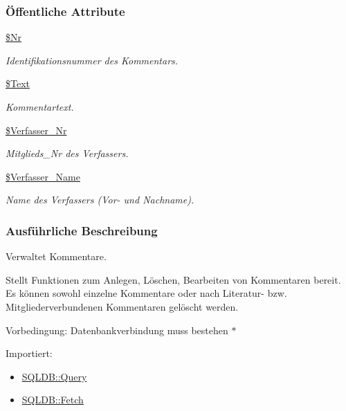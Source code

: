 \subsubsection*{\"{O}ffentliche Attribute}
\begin{CompactItemize}
\item 
\hyperlink{classKommentar_1b0a3cfcb9fc7075f985cc8067ab1982}{\$Nr}
\begin{CompactList}\small\item\em Identifikationsnummer des Kommentars. \item\end{CompactList}\item 
\hyperlink{classKommentar_c9a481413d6ba0c000719ad514bad4b5}{\$Text}
\begin{CompactList}\small\item\em Kommentartext. \item\end{CompactList}\item 
\hyperlink{classKommentar_c92b002e40690ee052fec446ff2a0ef6}{\$Verfasser\_\-Nr}
\begin{CompactList}\small\item\em Mitglieds\_\-Nr des Verfassers. \item\end{CompactList}\item 
\hyperlink{classKommentar_84f0fc10295968adde28169f8df018d9}{\$Verfasser\_\-Name}
\begin{CompactList}\small\item\em Name des Verfassers (Vor- und Nachname). \item\end{CompactList}\end{CompactItemize}


\subsubsection{Ausf\"{u}hrliche Beschreibung}
Verwaltet Kommentare. 

Stellt Funktionen zum Anlegen, Löschen, Bearbeiten von Kommentaren bereit. Es können sowohl einzelne Kommentare oder nach Literatur- bzw. Mitgliederverbundenen Kommentaren gelöscht werden. \begin{Desc}
\item[Vorbedingung:]Datenbankverbindung muss bestehen $\ast$\end{Desc}
\begin{Desc}
\item[Importiert:]\begin{itemize}
\item \hyperlink{classSQLDB_fc6ffa8df50f68f07d9f5e3385b96d7a}{SQLDB::Query}\item \hyperlink{classSQLDB_a55c00ce1de0e50e0a58cae61892ba35}{SQLDB::Fetch} \end{itemize}
\end{Desc}




